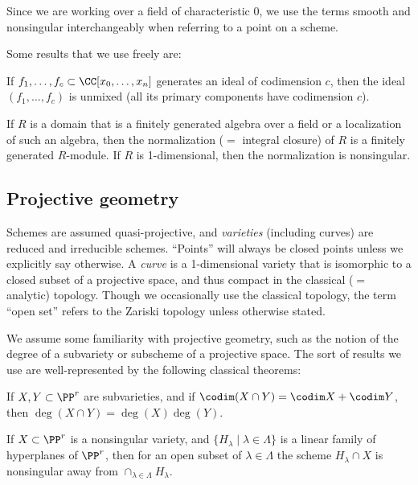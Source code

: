Since we are working over  a field of characteristic 0, we use the terms smooth and nonsingular interchangeably when
referring to a point on a scheme.

Some results that we use freely are:
 \begin{theorem}\label{Lasker}
If $f_1,\dots, f_c \subset \CC[x_0,\dots, x_n]$ generates an ideal of codimension $c$, then 
the ideal $(f_1,\dots, f_c)$ is unmixed (all its primary components have codimension $c$).
\end{theorem}

\begin{theorem}\label{finiteness of normalization}
 If $R$ is a domain that is a finitely generated algebra over a field or a localization of such an algebra, then the
normalization ($=$ integral closure) of $R$ is a finitely generated $R$-module.
If $R$ is 1-dimensional, then the normalization is nonsingular.
\end{theorem}

\subsection{Projective geometry}
Schemes are assumed quasi-projective, and \emph{varieties} (including curves) are reduced and irreducible schemes. ``Points'' will always be closed points unless we explicitly say otherwise. A \emph{curve} is a 1-dimensional variety that is isomorphic to a closed subset of a projective space, and thus compact in the classical ($=$ analytic) topology. Though we occasionally use the classical topology, 
the term ``open set'' refers to the Zariski topology unless otherwise stated.

We assume some familiarity with projective geometry, such as the notion of the degree of a 
subvariety or subscheme of a projective space. The sort of results we use are
 well-represented by the following classical theorems:

\begin{theorem}
If $X,Y\subset \PP^r$ are subvarieties, and if $\codim(X\cap Y) = \codim X + \codim Y$,
then $\deg (X\cap Y) = \deg(X)\deg(Y)$.
\end{theorem}

\begin{theorem}\label{Bertini}
If $X\subset \PP^r$  is a nonsingular variety, and $\{H_\lambda \mid \lambda\in \Lambda\}$ is a linear family of hyperplanes of $\PP^r$, then for an open subset of $\lambda\in \Lambda$ the scheme $H_\lambda \cap X$ is nonsingular away from 
$
\cap_{\lambda \in \Lambda} H_\lambda.
$
\end{theorem}

